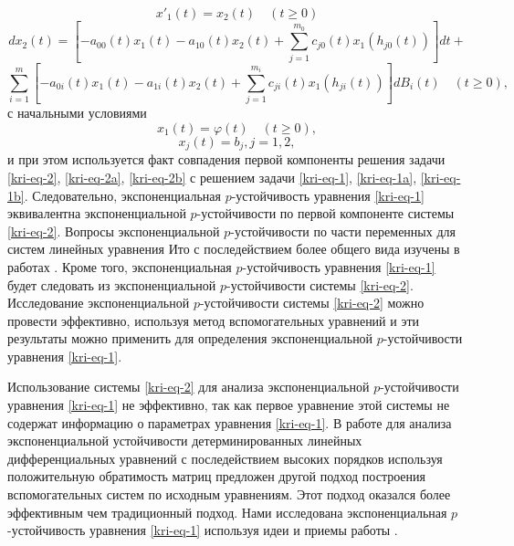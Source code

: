\begin{equation*}
	x'_1(t) = x_2(t)\quad(t\ge0)
\end{equation*}
\begin{equation}\label{kri-eq-2}
	dx_2(t) = \left[-a_{00}(t)x_1(t) - a_{10}(t)x_2(t) + \sum_{j=1}^{m_0}c_{j0}(t)x_1(h_{j0}(t))\right]dt +
\end{equation}
\begin{equation*}
	\sum_{i=1}^{m} \left[-a_{0i}(t)x_1(t)-a_{1i}(t)x_2(t)+\sum_{j=1}^{m_i}c_{ji}(t)x_1(h_{ji}(t))\right]dB_i(t) \quad (t \ge 0),
\end{equation*}
с начальными условиями
\begin{equation}\label{kri-eq-2a}
	x_1(t)=\varphi (t)\quad(t\ge 0),
\end{equation}
\begin{equation}\label{kri-eq-2b}
	x_j(t)=b_j, j=1,2,
\end{equation}
и при этом используется факт совпадения первой компоненты решения задачи \eqref{kri-eq-2}, \eqref{kri-eq-2a}, \eqref{kri-eq-2b} с решением задачи \eqref{kri-eq-1}, \eqref{kri-eq-1a},
\eqref{kri-eq-1b}. Следовательно, экспоненциальная  $p$-\linebreak устойчивость уравнения \eqref{kri-eq-1} эквивалентна экспоненциальной
$p${}-устойчивости по первой компоненте системы \eqref{kri-eq-2}. Вопросы экспоненциальной  $p${}-устойчивости по части переменных
для систем линейных уравнения Ито с последействием более общего вида изучены в работах \cite{kri-bib-19, kri-bib-20}. Кроме того,
экспоненциальная  $p${}-устойчивость уравнения \eqref{kri-eq-1} будет следовать из экспоненциальной  $p${}-устойчивости системы \eqref{kri-eq-2}.
Исследование экспоненциальной  $p${}-устойчивости системы \eqref{kri-eq-2} можно провести эффективно, используя метод
вспомогательных уравнений и эти результаты можно применить для определения экспоненциальной  $p${}-устойчивости
уравнения \eqref{kri-eq-1}.

Использование системы \eqref{kri-eq-2} для анализа экспоненциальной  $p${}-устойчивости \linebreak уравнения \eqref{kri-eq-1} не эффективно, так как первое
уравнение этой системы не содержат информацию о параметрах уравнения \eqref{kri-eq-1}. В работе \cite{kri-bib-16} для анализа экспоненциальной
устойчивости детерминированных линейных дифференциальных уравнений с последействием высоких порядков используя
положительную обратимость матриц предложен другой подход построения вспомогательных систем по исходным уравнениям. Этот
подход оказался более эффективным чем традиционный подход. Нами исследована экспоненциальная  $p${}-устойчивость
уравнения \eqref{kri-eq-1} используя идеи и приемы работы \cite{kri-bib-16}.

